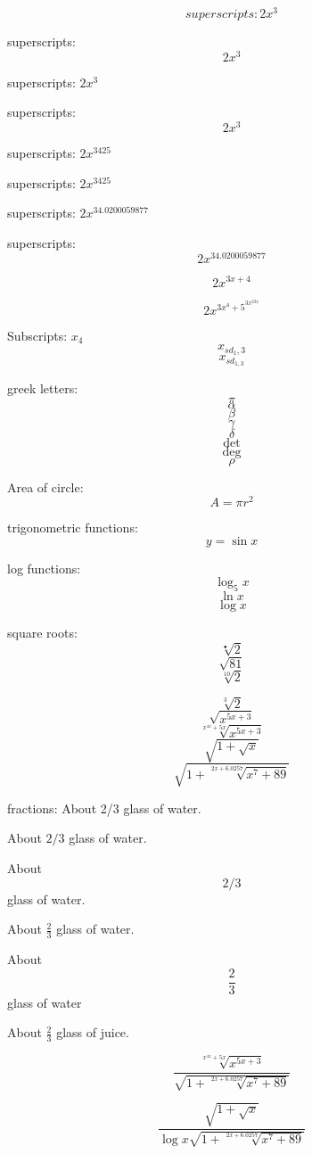 \documentclass[11pt]{article}
\begin{document}
$$superscripts:2x^3$$

superscripts:$$2x^3$$

superscripts:  $2x^3$

superscripts:
$$2x^3$$

superscripts: $2x^3425$

superscripts: $2x^{3425}$

superscripts: $2x^{34.0200059877}$

superscripts: $$2x^{34.0200059877}$$

$$2x^{3x+4}$$

$$2x^{3x^4+5^{3x^{23x}}}$$


Subscripts:
$x_4$
$$x_{sd_1,3}$$ 
$$x_{sd_{1,3}}$$ 

greek letters:
$$\pi$$
$$\alpha$$
$$\beta$$
$$\gamma$$
$$\delta$$
$$\det$$
$$\deg$$
$$\rho$$


Area of circle:
$$A = \pi r^2 $$

trigonometric functions:
$$y=\sin{x}$$

log functions:
$$\log_5{x}$$
$$\ln{x}$$
$$\log{x}$$

square roots:
$$\sqrt[•]{2}$$
$$\sqrt{81}$$
$$\sqrt[10]{2}$$

$$\sqrt[3]{2}$$
$$\sqrt{x^{5x+3}}$$
$$\sqrt[{x^{4x}+5x}]{x^{5x+3}}$$
$$\sqrt{1+\sqrt{x}}$$
$$\sqrt{1+\sqrt[{2x+6.0257}]{x^7+ 89}} $$

fractions:
About 2/3 glass of water.

About $2/3$ glass of water.

About $$2/3$$ glass of water.


About $\frac{2}{3}$ glass of water.

About $$\frac{2}{3}$$ glass of water


About $\displaystyle{\frac{2}{3}}$ glass of juice.

$$\frac{{\sqrt[{x^{4x}+5x}]{x^{5x+3}}}}{{\sqrt{1+\sqrt[{2x+6.0257}]{x^7+ 89}}}}$$

$$\frac{{\sqrt{1+\sqrt{x}}}}{\log{x} \sqrt{1+\sqrt[{2x+6.0257}]{x^7+ 89}}}$$
\end{document}
